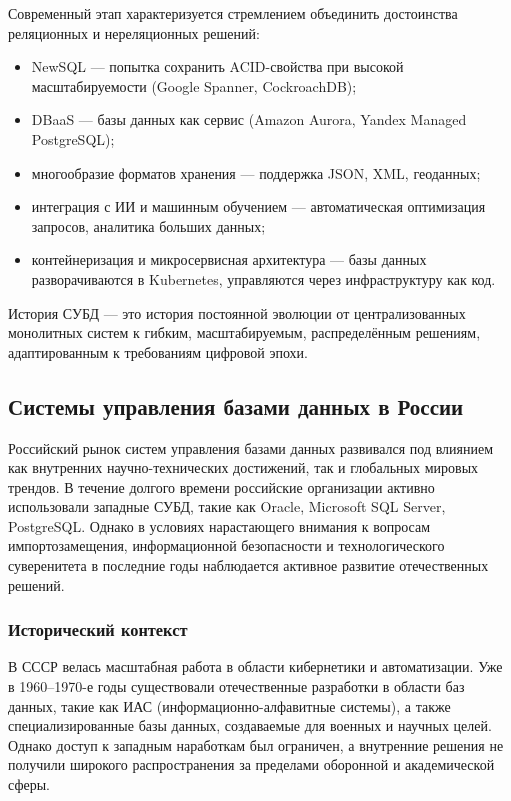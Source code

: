 Современный этап характеризуется стремлением объединить достоинства реляционных и нереляционных решений:
\begin{itemize}
	\item NewSQL — попытка сохранить ACID-свойства при высокой масштабируемости (Google Spanner, CockroachDB);
	\item DBaaS — базы данных как сервис (Amazon Aurora, Yandex Managed PostgreSQL);
	\item многообразие форматов хранения — поддержка JSON, XML, геоданных;
	\item интеграция с ИИ и машинным обучением — автоматическая оптимизация запросов, аналитика больших данных;
	\item контейнеризация и микросервисная архитектура — базы данных разворачиваются в Kubernetes, управляются через инфраструктуру как код.
\end{itemize}

История СУБД — это история постоянной эволюции от централизованных монолитных систем к гибким, масштабируемым, распределённым решениям, адаптированным к требованиям цифровой эпохи.

\subsection{Системы управления базами данных в России}

Российский рынок систем управления базами данных развивался под влиянием как внутренних научно-технических достижений, так и глобальных мировых трендов. В течение долгого времени российские организации активно использовали западные СУБД, такие как Oracle, Microsoft SQL Server, PostgreSQL. Однако в условиях нарастающего внимания к вопросам импортозамещения, информационной безопасности и технологического суверенитета в последние годы наблюдается активное развитие отечественных решений.

\subsubsection{Исторический контекст}

В СССР велась масштабная работа в области кибернетики и автоматизации. Уже в 1960–1970-е годы существовали отечественные разработки в области баз данных, такие как ИАС (информационно-алфавитные системы), а также специализированные базы данных, создаваемые для военных и научных целей. Однако доступ к западным наработкам был ограничен, а внутренние решения не получили широкого распространения за пределами оборонной и академической сферы.

